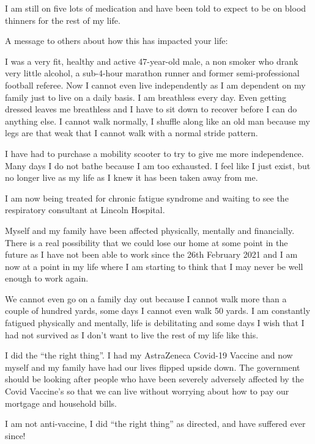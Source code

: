 I am still on five lots of medication and have been told to expect to be on
blood thinners for the rest of my life.

A message to others about how this has impacted your life:

I was a very fit, healthy and active 47-year-old male, a non smoker who drank
very little alcohol, a sub-4-hour marathon runner and former semi-professional
football referee. Now I cannot even live independently as I am dependent on my
family just to live on a daily basis. I am breathless every day. Even getting
dressed leaves me breathless and I have to sit down to recover before I can do
anything else. I cannot walk normally, I shuffle along like an old man because
my legs are that weak that I cannot walk with a normal stride pattern.

I have had to purchase a mobility scooter to try to give me more
independence. Many days I do not bathe because I am too exhausted. I feel like I
just exist, but no longer live as my life as I knew it has been taken away from
me.

I am now being treated for chronic fatigue syndrome and waiting to see the
respiratory consultant at Lincoln Hospital.

Myself and my family have been affected physically, mentally and
financially. There is a real possibility that we could lose our home at some
point in the future as I have not been able to work since the 26th February 2021
and I am now at a point in my life where I am starting to think that I may never
be well enough to work again.

We cannot even go on a family day out because I cannot walk more than a couple
of hundred yards, some days I cannot even walk 50 yards. I am constantly
fatigued physically and mentally, life is debilitating and some days I wish that
I had not survived as I don’t want to live the rest of my life like this.

I did the “the right thing”. I had my AstraZeneca Covid-19 Vaccine and now
myself and my family have had our lives flipped upside down. The government
should be looking after people who have been severely adversely affected by the
Covid Vaccine’s so that we can live without worrying about how to pay our
mortgage and household bills.

I am not anti-vaccine, I did “the right thing” as directed, and have suffered
ever since!

